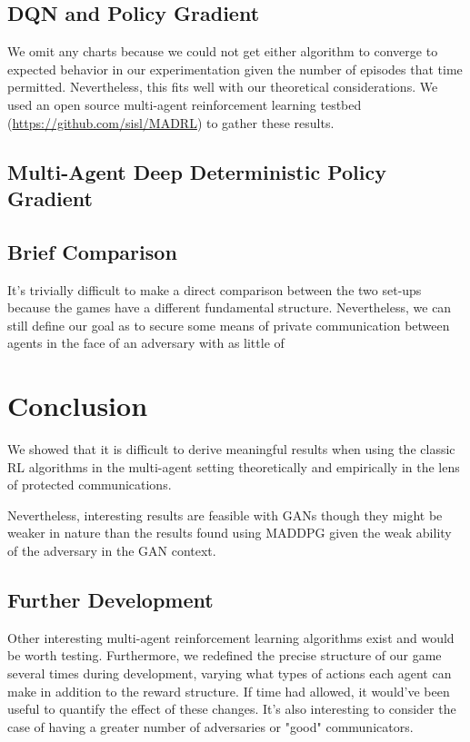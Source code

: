 \documentclass{llncs}
\begin{document}
\subsection{DQN and Policy Gradient}

We omit any charts because we could not get either algorithm to converge to expected behavior in our experimentation given the number of episodes that time permitted. Nevertheless, this fits well with our theoretical considerations. We used an open source multi-agent reinforcement learning testbed (\url{https://github.com/sisl/MADRL}) to gather these results. 

\subsection{Multi-Agent Deep Deterministic Policy Gradient}

\subsection{Brief Comparison}

It's trivially difficult to make a direct comparison between the two set-ups because the games have a different fundamental structure. Nevertheless, we can still define our goal as to secure some means of private communication between agents in the face of an adversary with as little of 

\section{Conclusion}

We showed that it is difficult to derive meaningful results when using the classic RL algorithms in the multi-agent setting theoretically and empirically in the lens of protected communications. 

Nevertheless, interesting results are feasible with GANs though they might be weaker in nature than the results found using MADDPG given the weak ability of the adversary in the GAN context. 
\subsection{Further Development}

Other interesting multi-agent reinforcement learning algorithms exist and would be worth testing\cite{gupta2017cooperative}. Furthermore, we redefined the precise structure of our game several times during development, varying what types of actions each agent can make in addition to the reward structure. If time had allowed, it would've been useful to quantify the effect of these changes. It's also interesting to consider the case of having a greater number of adversaries or "good" communicators. 
\end{document}
